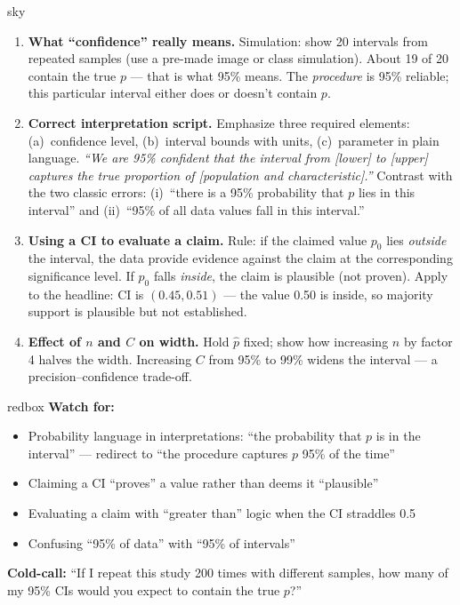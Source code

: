 \documentclass[10pt]{article}
\begin{document}
\begin{skillbox}[Lesson]{sky}
    \begin{enumerate}[leftmargin=1.4em, label=\arabic*.]
        \item \textbf{What ``confidence'' really means.} Simulation: show 20 intervals from
              repeated samples (use a pre-made image or class simulation). About 19 of 20 contain
              the true $p$ --- that is what 95\% means. The \emph{procedure} is 95\% reliable;
              this particular interval either does or doesn't contain $p$.

        \item \textbf{Correct interpretation script.} Emphasize three required elements:
              (a)~confidence level, (b)~interval bounds with units, (c)~parameter in plain language.
              \textit{``We are 95\% confident that the interval from [lower] to [upper] captures
              the true proportion of [population and characteristic].''}
              Contrast with the two classic errors: (i)~``there is a 95\% probability that $p$
              lies in this interval'' and (ii)~``95\% of all data values fall in this interval.''

        \item \textbf{Using a CI to evaluate a claim.}
              Rule: if the claimed value $p_0$ lies \emph{outside} the interval, the data provide
              evidence against the claim at the corresponding significance level. If $p_0$ falls
              \emph{inside}, the claim is plausible (not proven). Apply to the headline: CI is
              $(0.45, 0.51)$ --- the value 0.50 is inside, so majority support is plausible but
              not established.

        \item \textbf{Effect of $n$ and $C$ on width.} Hold $\hat p$ fixed; show how increasing
              $n$ by factor 4 halves the width. Increasing $C$ from 95\% to 99\% widens the
              interval --- a precision--confidence trade-off.
    \end{enumerate}
\end{skillbox}

\begin{skillbox}{redbox}
    \textbf{Watch for:}
    \begin{itemize}[leftmargin=1.2em]
        \item Probability language in interpretations: ``the probability that $p$ is in the
              interval'' --- redirect to ``the procedure captures $p$ 95\% of the time''
        \item Claiming a CI ``proves'' a value rather than deems it ``plausible''
        \item Evaluating a claim with ``greater than'' logic when the CI straddles 0.5
        \item Confusing ``95\% of data'' with ``95\% of intervals''
    \end{itemize}
    \textbf{Cold-call:} ``If I repeat this study 200 times with different samples, how many of
    my 95\% CIs would you expect to contain the true $p$?''
\end{skillbox}
\end{document}

